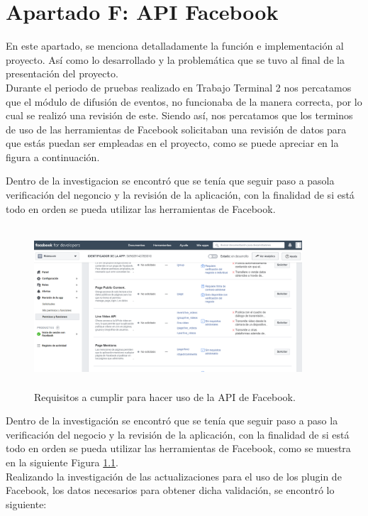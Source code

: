 	\chapter{Apartado F: API Facebook}
	\label{apiFB}
	\noindent En este apartado, se menciona detalladamente la función e implementación al proyecto. Así como lo desarrollado y la problemática que se tuvo al final de la presentación del proyecto.\\
		
	\noindent Durante el periodo de pruebas realizado en Trabajo Terminal 2 nos percatamos que el módulo de difusión de eventos, no funcionaba de la manera correcta, por lo cual se realizó una revisión de este. Siendo así, nos percatamos que los terminos de uso de las herramientas de Facebook solicitaban una revisión de datos para que estás puedan ser empleadas en el proyecto, como se puede apreciar en la figura a continuación.
	
	Dentro de la investigacion se encontró que se  tenía que seguir paso a pasola verificación del negoncio y la revisión de la aplicación, con la finalidad de si está todo en orden se pueda utilizar las herramientas de Facebook.
	
	\begin{figure}[hbt!]
		\centering
		\includegraphics[width=10cm, height=6cm]{Imagenes/FacebookAPI/RequisitoPagina}
		\caption{Requisitos a cumplir para hacer uso de la API de Facebook.}
		\label{requisitosfb}
	\end{figure}
	
	\noindent Dentro de la investigación se encontró que se tenía que seguir paso a paso la
	verificación del negocio y la revisión de la aplicación, con la finalidad de si está todo en orden se
	pueda utilizar las herramientas de Facebook, como se muestra en la siguiente Figura \ref{requisitosfb}. \\
	
	\noindent Realizando la investigación de las actualizaciones para el uso de los plugin de Facebook,
	los datos necesarios para obtener dicha validación, se encontró lo siguiente: \\
	\pagebreak
	
